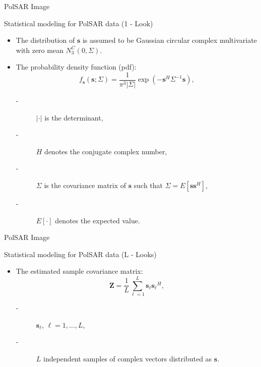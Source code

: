 \documentclass[10pt]{beamer}
\begin{document}
\begin{frame}[fragile]{PolSAR Image}
\begin{alertblock}{Statistical modeling for PolSAR data (1 - Look)}
\begin{itemize}
\item The distribution of $\mathbf{s}$ is assumed to be  Gaussian circular complex multivariate with zero mean $N^{C}_3(0,\Sigma)$.
\item The probability density function (pdf):
\begin{equation}
    f_{\mathbf{s}}(\mathbf{s};\Sigma)=\frac{1}{\pi^3|\Sigma|} \exp(-\mathbf{s}^H\Sigma^{-1}\mathbf{s}),
    \label{eq_02}
\end{equation}
        \begin{description}
        \item[-] $|\cdot|$ is the determinant, 
        \item[-] $H$ denotes the conjugate complex number, 
        \item[-] $\Sigma$ is the covariance matrix of $\mathbf{s}$ such that $\Sigma=E[\mathbf{ss}^H]$,
        \item[-] $E[\cdot]$ denotes the expected value. 
        \end{description}
\end{itemize}
\end{alertblock}
\end{frame}
%
\begin{frame}[fragile]{PolSAR Image}
\begin{alertblock}{Statistical modeling for PolSAR data (L - Looks)}
\begin{itemize}
\item The estimated sample covariance matrix:
\begin{equation}
    \mathbf{Z}=\frac{1}{L}\sum_{\ell=1}^{L} {\mathbf{s}_\ell}{\mathbf{s}_\ell}^H,
    \label{eq_03}
\end{equation}
\begin{description}
      \item[-] $\mathbf{s}_\ell$, $\ell = 1, \dots, L$,
      \item[-] $L$ independent samples of complex vectors distributed as $\mathbf{s}$. 
\end{description}
\end{itemize}
\end{alertblock}
\end{frame}
\end{document}
